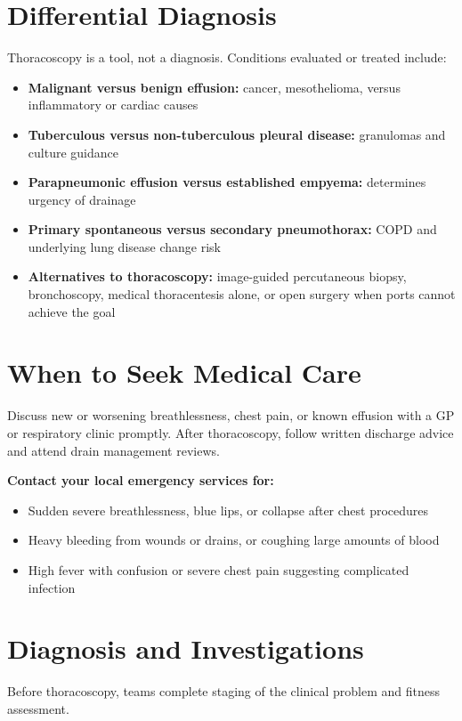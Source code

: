 \section*{Differential Diagnosis}
Thoracoscopy is a tool, not a diagnosis. Conditions evaluated or treated include:

\begin{itemize}
    \item \textbf{Malignant versus benign effusion:} cancer, mesothelioma, versus inflammatory or cardiac causes
    \item \textbf{Tuberculous versus non-tuberculous pleural disease:} granulomas and culture guidance
    \item \textbf{Parapneumonic effusion versus established empyema:} determines urgency of drainage
    \item \textbf{Primary spontaneous versus secondary pneumothorax:} COPD and underlying lung disease change risk
    \item \textbf{Alternatives to thoracoscopy:} image-guided percutaneous biopsy, bronchoscopy, medical thoracentesis alone, or open surgery when ports cannot achieve the goal
\end{itemize}

\section*{When to Seek Medical Care}
Discuss new or worsening breathlessness, chest pain, or known effusion with a GP or respiratory clinic promptly. After thoracoscopy, follow written discharge advice and attend drain management reviews.

\textbf{Contact your local emergency services for:}
\begin{itemize}
    \item Sudden severe breathlessness, blue lips, or collapse after chest procedures
    \item Heavy bleeding from wounds or drains, or coughing large amounts of blood
    \item High fever with confusion or severe chest pain suggesting complicated infection
\end{itemize}

\section*{Diagnosis and Investigations}
Before thoracoscopy, teams complete staging of the clinical problem and fitness assessment.

